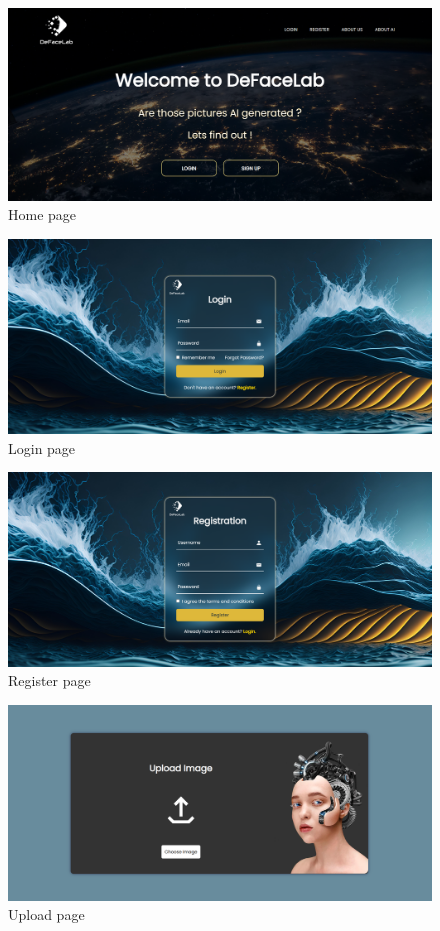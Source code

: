 \begin{figure}[ht]
    \centering
    \includegraphics[width= 6in]{img/web-home.png}
    \caption{Home page}
\end{figure}

\begin{figure}[ht]
    \centering
    \includegraphics[width= 6in]{img/web-login.png}
    \caption{Login page}
\end{figure}
\begin{figure}[ht]
    \centering
    \includegraphics[width= 6in]{img/web-register.png}
    \caption{Register page}
\end{figure}
\begin{figure}[ht]
    \centering
    \includegraphics[width= 6in]{img/web-upload.png}
    \caption{Upload page}
\end{figure}